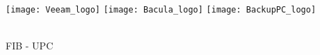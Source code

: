 
\thispagestyle{empty}
\clearpage
\setcounter{page}{-1}

\makeatletter
\begin{titlepage}
{
    \centering
    \null
    \vfill
    {\Huge \bfseries \@title \par}
    \vspace{2em}
    {\large \scshape \@date \par}
    \vfill
\begin{center}

    \texttt{[image: Veeam\_logo]}
    \texttt{[image: Bacula\_logo]}
    \texttt{[image: BackupPC\_logo]}

\end{center}
    \vspace{3cm}

    \vfill
    {\raggedleft \large \@author \\
        FIB - UPC
    \par}
}
\end{titlepage}
\makeatother
